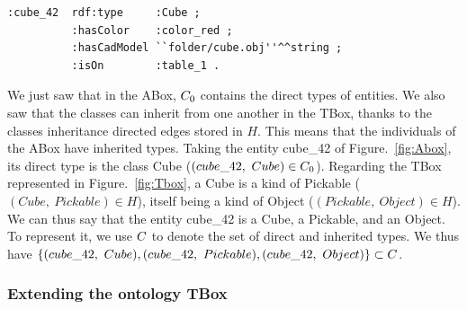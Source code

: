 \begin{lstlisting}[frame=single, basicstyle=\scriptsize\ttfamily, label={lst:Abox}, caption={Description of an ontology individual in the OWL language using the Turle syntax.},captionpos=b, style=OwlTurtle_indiv]
:cube_42  rdf:type     :Cube ;
          :hasColor    :color_red ;
          :hasCadModel ``folder/cube.obj''^^string ;
          :isOn        :table_1 .
\end{lstlisting}

We just saw that in the ABox, $C_0$ contains the direct types of entities. We also saw that the classes can inherit from one another in the TBox, thanks to the classes inheritance directed edges stored in $H$. This means that the individuals of the ABox have inherited types. Taking the entity cube\_42 of Figure.~\ref{fig:Abox}, its direct type is the class Cube ($(cube\_42,\ Cube) \in \inheritset_0$). Regarding the TBox represented in Figure.~\ref{fig:Tbox}, a Cube is a kind of Pickable ($(Cube,\ Pickable) \in H$), itself being a kind of Object ($(Pickable,\ Object) \in H$). We can thus say that the entity cube\_42 is a Cube, a Pickable, and an Object. To represent it, we use $C$ to denote the set of direct and inherited types. We thus have $\{ (cube\_42,\ Cube), (cube\_42,\ Pickable), (cube\_42,\ Object)\} \subset \inheritset$.

\subsubsection{Extending the ontology TBox}

